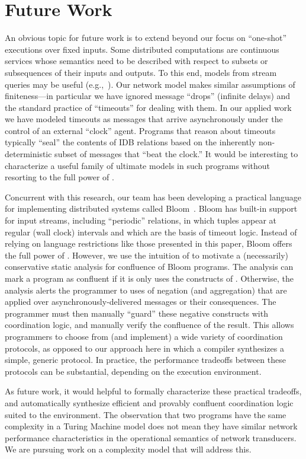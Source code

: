 \section{Future Work}
\label{sec:conclusion}

An obvious topic for future work is to extend beyond our focus on ``one-shot'' executions over fixed inputs.  
Some distributed computations are continuous services whose semantics need to be described with respect to subsets or subsequences of their inputs and outputs.  To this end, models from stream queries may be useful (e.g.,~\cite{Chandramouli2009}).  
Our network model makes similar assumptions of finiteness---in particular we have ignored message ``drops'' (infinite delays) and the standard practice of ``timeouts'' for dealing with them.  In our applied work~\cite{boom,cidr11} we have modeled timeouts as messages that arrive asynchronously under the control of an external ``clock'' agent.  Programs that reason about timeouts typically ``seal'' the contents of IDB relations based on the inherently non-deterministic subset of messages that ``beat the clock.''  It would be interesting to characterize a useful family of ultimate models in such programs without resorting to the full power of \lang.

Concurrent with this research, our team has been developing a practical language for implementing distributed
systems called Bloom~\cite{bloom}.  Bloom has built-in support for input streams, including ``periodic'' relations,
in which tuples appear at regular (wall clock) intervals and which are the basis of timeout logic.
Instead of relying on language restrictions like those presented in this paper, Bloom offers the full power of \lang.  However, we use the intuition of \plang to motivate a (necessarily) conservative static analysis for confluence of Bloom programs.  The analysis can mark a program as confluent if it is only uses the constructs of \slang.  Otherwise, the analysis alerts the programmer to uses of negation (and aggregation) that are applied over asynchronously-delivered messages or their consequences.  The programmer must then manually ``guard'' these negative constructs with coordination logic, and manually verify the confluence of the result.
This allows programmers to choose from (and implement) a wide variety of coordination protocols, as opposed to our approach here in which a compiler synthesizes a simple, generic protocol.  
In practice, the performance tradeoffs between these protocols can be substantial, depending on the execution environment.  

As future work, it would helpful to formally characterize these practical tradeoffs, and automatically synthesize efficient and provably confluent coordination logic suited to the environment.
The observation that two programs have the same complexity in a Turing Machine model does not mean they have similar network performance characteristics in the operational semantics of network transducers.  We are pursuing work on a complexity model that will address this.

